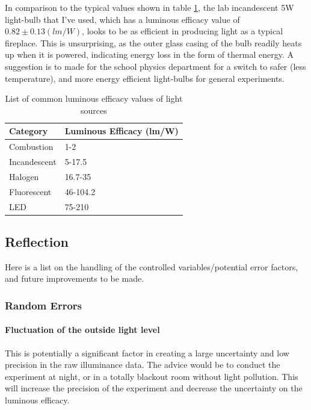 \documentclass[a4paper,12pt]{article}
\begin{document}
In comparison to the typical values shown in table \ref{tbl:leff}, the lab incandescent 5W light-bulb that I've used, which has a luminous efficacy value of $0.82 \pm 0.13 (\si{lm\per W})$, looks to be as efficient in producing light as a typical fireplace. This is unsurprising, as the outer glass casing of the bulb readily heats up when it is powered, indicating energy loss in the form of thermal energy. A suggestion is to made for the school physics department for a switch to safer (less temperature), and more energy efficient light-bulbs for general experiments.

\begin{table}[H]
    \centering
    \begin{tabular}{l|l}
        Category     & Luminous Efficacy (lm/W) \\ \hline
        Combustion   & 1-2                      \\
        Incandescent & 5-17.5                   \\
        Halogen      & 16.7-35                  \\
        Fluorescent  & 46-104.2                 \\
        LED          & 75-210
    \end{tabular}
    \caption{List of common luminous efficacy values of light sources}
    \label{tbl:leff}
\end{table}


\subsection{Reflection}

Here is a list on the handling of the controlled variables/potential error factors, and future improvements to be made.

\subsubsection{Random Errors}
\paragraph{Fluctuation of the outside light level} This is potentially a significant factor in creating a large uncertainty and low precision in the raw illuminance data. The advice would be to conduct the experiment at night, or in a totally blackout room without light pollution. This will increase the precision of the experiment and decrease the uncertainty on the luminous efficacy.
\end{document}
